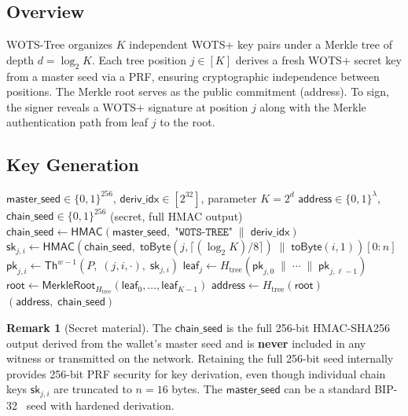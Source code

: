 \documentclass[11pt,a4paper]{article}
\theoremstyle{definition}
\newtheorem{remark}[theorem]{Remark}
\begin{document}
\subsection{Overview}

WOTS-Tree organizes $K$ independent WOTS+ key pairs under a Merkle tree of depth $d = \log_2 K$. Each tree position $j \in [K]$ derives a fresh WOTS+ secret key from a master seed via a PRF, ensuring cryptographic independence between positions. The Merkle root serves as the public commitment (address). To sign, the signer reveals a WOTS+ signature at position $j$ along with the Merkle authentication path from leaf $j$ to the root.

\subsection{Key Generation}
\label{sec:keygen}

\begin{algorithm}[h]
\caption{WOTS-Tree Key Generation}
\label{alg:keygen}
\begin{algorithmic}[1]
\Require $\mathsf{master\_seed} \in \{0,1\}^{256}$, $\mathsf{deriv\_idx} \in [2^{32}]$, parameter $K = 2^d$
\Ensure $\mathsf{address} \in \{0,1\}^{\lambda}$, $\mathsf{chain\_seed} \in \{0,1\}^{256}$ (secret, full HMAC output)
\State $\mathsf{chain\_seed} \gets \mathsf{HMAC}(\mathsf{master\_seed},\; \texttt{"WOTS-TREE"} \;\|\; \mathsf{deriv\_idx})$ 
 
     
        \State $\mathsf{sk}_{j,i} \gets \mathsf{HMAC}(\mathsf{chain\_seed},\; \mathsf{toByte}(j, \lceil(\log_2 K) / 8\rceil) \;\|\; \mathsf{toByte}(i, 1))[0:n]$
        \State $\mathsf{pk}_{j,i} \gets \mathsf{Th}^{w-1}(P,\; (j, i, \cdot),\; \mathsf{sk}_{j,i})$ 
    \EndFor
    \State $\mathsf{leaf}_j \gets H_{\mathrm{tree}}(\mathsf{pk}_{j,0} \;\|\; \cdots \;\|\; \mathsf{pk}_{j,\ell-1})$ 
\EndFor
\State $\mathsf{root} \gets \mathsf{MerkleRoot}_{H_{\mathrm{tree}}}(\mathsf{leaf}_0, \ldots, \mathsf{leaf}_{K-1})$ 
\State $\mathsf{address} \gets H_{\mathrm{tree}}(\mathsf{root})$
\State \Return $(\mathsf{address},\; \mathsf{chain\_seed})$
\end{algorithmic}
\end{algorithm}

\begin{remark}[Secret material]
The $\mathsf{chain\_seed}$ is the full 256-bit HMAC-SHA256 output derived from the wallet's master seed and is \textbf{never} included in any witness or transmitted on the network. Retaining the full 256-bit seed internally provides 256-bit PRF security for key derivation, even though individual chain keys $\mathsf{sk}_{j,i}$ are truncated to $n = 16$ bytes. The $\mathsf{master\_seed}$ can be a standard BIP-32~\cite{bip32} seed with hardened derivation.
\end{remark}
\end{document}
